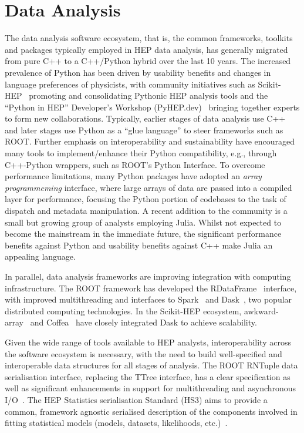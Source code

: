 \documentclass[10pt,a4paper]{article}
\begin{document}
\section{Data Analysis}\label{data-analysis}

The data analysis software ecosystem, that is, the common frameworks, toolkits
and packages typically employed in HEP data analysis, has generally migrated
from pure C++ to a C++/Python hybrid over the last 10 years. The increased
prevalence of Python has been driven by usability benefits and changes in
language preferences of physicists, with community initiatives such as
Scikit-HEP~\cite{Rodrigues_2020} promoting and consolidating Pythonic HEP
analysis tools and the ``Python in HEP'' Developer's Workshop
(PyHEP.dev)~\cite{alshehri2024pyhepdev2024workshopsummary} bringing together
experts to form new collaborations. Typically, earlier stages of data analysis
use C++ and later stages use Python as a ``glue language'' to steer frameworks
such as ROOT. Further emphasis on interoperability and sustainability have
encouraged many tools to implement/enhance their Python compatibility, e.g.,
through C++-Python wrappers, such as ROOT's Python Interface. To overcome
performance limitations, many Python packages have adopted an \emph{array
programmeming} interface, where large arrays of data are passed into a compiled
layer for performance, focusing the Python portion of codebases to the task of
dispatch and metadata manipulation. A recent addition to the community is a
small but growing group of analysts employing Julia. Whilst not expected to
become the mainstream in the immediate future, the significant performance
benefits against Python and usability benefits against C++ make Julia an
appealing language.

In parallel, data analysis frameworks are improving integration with computing
infrastructure. The ROOT framework has developed the
RDataFrame~\cite{ROOT:RDataFrame} interface, with improved
multithreading and interfaces to Spark~\cite{10.1145/2934664}
and Dask~\cite{matthew_rocklin-proc-scipy-2015}, two popular distributed
computing technologies. In the Scikit-HEP ecosystem,
awkward-array~\cite{Pivarski_2020} and Coffea~\cite{Smith_2020} have closely
integrated Dask to achieve scalability.

Given the wide range of tools available to HEP analysts, interoperability across
the software ecosystem is necessary, with the need to build well-specified and
interoperable data structures for all stages of analysis. The ROOT RNTuple data
serialisation interface, replacing the TTree interface, has a clear
specification as well as significant enhancements in support for multithreading
and asynchronous I/O~\cite{ROOT:RDataFrame_prod_path}. The
HEP Statistics serialisation Standard (HS3) aims to provide a common, framework
agnostic serialised description of the components involved in fitting
statistical models (models, datasets, likelihoods,
etc.)~\cite{HS3github}.
\end{document}
